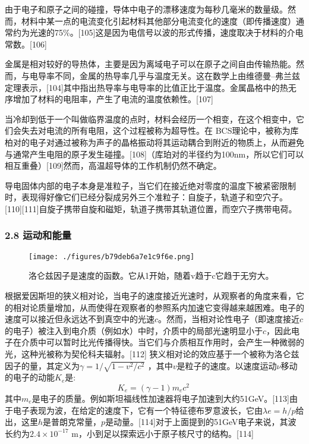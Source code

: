 由于电子和原子之间的碰撞，导体中电子的漂移速度为每秒几毫米的数量级。然而，材料中某一点的电流变化引起材料其他部分电流变化的速度（即传播速度）通常约为光速的75\%。[105]这是因为电信号以波的形式传播，速度取决于材料的介电常数。[106]

金属是相对较好的导热体，主要是因为离域电子可以在原子之间自由传输热能。然而，与电导率不同，金属的热导率几乎与温度无关。这在数学上由维德曼–弗兰兹定理表示，[104]其中指出热导率与电导率的比值正比于温度。金属晶格中的热无序增加了材料的电阻率，产生了电流的温度依赖性。[107]

当冷却到低于一个叫做临界温度的点时，材料会经历一个相变，在这个相变中，它们会失去对电流的所有电阻，这个过程被称为超导性。在 BCS理论中，被称为库柏对的电子对通过被称为声子的晶格振动将其运动耦合到附近的物质上，从而避免与通常产生电阻的原子发生碰撞。[108]（库珀对的半径约为100nm，所以它们可以相互重叠）[109]然而，高温超导体的工作机制仍然不确定。

导电固体内部的电子本身是准粒子，当它们在接近绝对零度的温度下被紧密限制时，表现得好像它们已经分裂成另外三个准粒子：自旋子，轨道子和空穴子。[110][111]自旋子携带自旋和磁矩，轨道子携带其轨道位置，而空穴子携带电荷。
\subsubsection{2.8 运动和能量}
\begin{figure}[ht]
\centering
\texttt{[image: ./figures/b79deb6a7e1c9f6e.png]}
\caption{洛仑兹因子是速度的函数。它从1开始，随着v趋于c它趋于无穷大。} \label{fig_DZ_12}
\end{figure}
根据爱因斯坦的狭义相对论，当电子的速度接近光速时，从观察者的角度来看，它的相对论质量增加，从而使得在观察者的参照系内加速它变得越来越困难。电子的速度可以接近但永远达不到真空中的光速$c$。然而，当相对论性电子（即速度接近$c$的电子）被注入到电介质（例如水）中时，介质中的局部光速明显小于$c$，因此电子在介质中可以暂时比光传播得快。当它们与介质相互作用时，会产生一种微弱的光，这种光被称为契伦科夫辐射。[112]
狭义相对论的效应基于一个被称为洛仑兹因子的量，其定义为$\gamma=1/ \sqrt{1-v^2/c^2}$  ，其中$v$是粒子的速度。以速度运动$\nu$移动的电子的动能$K_e$是:
$$K_e=(\gamma-1)m_ec^2~$$
其中$m_e$是电子的质量。例如斯坦福线性加速器将电子加速到大约51GeV。[113]由于电子表现为波，在给定的速度下，它有一个特征德布罗意波长，它由$\lambda e = h/p$给出，这里$h$是普朗克常量，$p$是动量。[114]对于上面提到的51GeV电子来说，其波长约为$2.4\times10^{-17}$ m，小到足以探索远小于原子核尺寸的结构。[114]

